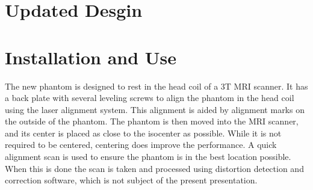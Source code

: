 \section{Updated Desgin}






\section{Installation and Use}

The new phantom is designed to rest in the head coil of a 3T MRI scanner.  It has a back plate with several
leveling screws to align the phantom in the head coil using the laser alignment system.  This alignment is
aided by alignment marks on the outside of the phantom. The phantom is then moved into the MRI scanner,
and its center is placed as close to the isocenter as possible.  While it is not required to be centered,
centering does improve the performance.  A quick alignment scan is used to ensure the phantom is in the best
location possible.  When this is done the scan is taken and processed using distortion detection and
correction software, which is not subject of the present presentation.


